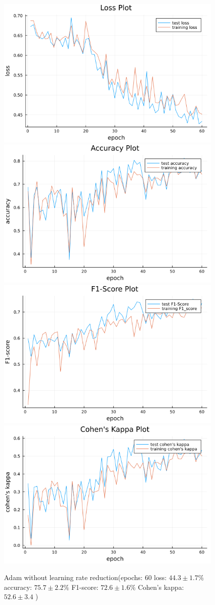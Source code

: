 \documentclass[
a4paper, 
12pt,
grayscalebody, %
abstract=on,
twoside, BCOR10mm, 12pt, DIV13,headinclude, footexclude, final, abstracton, openright
]{ibireprt}
\numberwithin{equation}{chapter}
\numberwithin{table}{chapter}
\numberwithin{figure}{chapter}
\numberwithin{algorithm}{chapter}
\numberwithin{example}{chapter}
\numberwithin{example}{chapter}
\begin{document}
\begin{figure}[h]
	\includegraphics[width=0.4\linewidth]{loss_png_11_1.png}\hfill
	\includegraphics[width=0.4\linewidth]{accuracy_png_11_1.png}
	\\[\smallskipamount]
	\includegraphics[width=0.4\linewidth]{f1_score_png_11_1.png}\hfill
	\includegraphics[width=0.4\linewidth]{cohens_kappa_png_11_1.png}
	\caption{Adam without learning rate reduction(epochs: 60 loss: $44.3\pm1.7\% $ accuracy: $75.7\pm2.2\%$ F1-score: $72.6\pm1.6\%$  Cohen's kappa: $52.6\pm3.4$ )}
\end{figure}%
\end{document}
